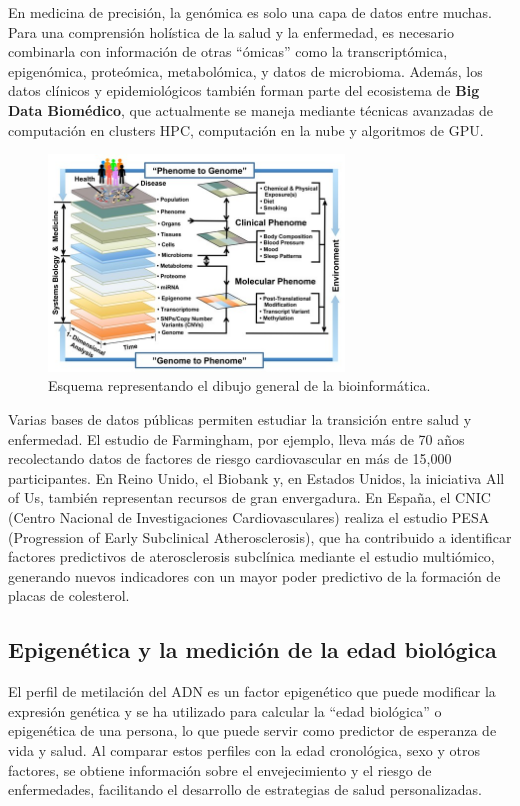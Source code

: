 En medicina de precisión, la genómica es solo una capa de datos entre muchas. Para una comprensión holística de la salud y la enfermedad, es necesario combinarla con información de otras “ómicas” como la transcriptómica, epigenómica, proteómica, metabolómica, y datos de microbioma. Además, los datos clínicos y epidemiológicos también forman parte del ecosistema de \textbf{Big Data Biomédico}, que actualmente se maneja mediante técnicas avanzadas de computación en clusters HPC, computación en la nube y algoritmos de GPU.

\begin{figure}[htbp]
\centering
\includegraphics[width = 0.7\textwidth]{figs/bigger-picture-bioinfo.jpg}
\caption{Esquema representando el dibujo general de la bioinformática.}
\end{figure}

Varias bases de datos públicas permiten estudiar la transición entre salud y enfermedad. El estudio de Farmingham, por ejemplo, lleva más de 70 años recolectando datos de factores de riesgo cardiovascular en más de 15,000 participantes. En Reino Unido, el Biobank y, en Estados Unidos, la iniciativa All of Us, también representan recursos de gran envergadura. En España, el CNIC (Centro Nacional de Investigaciones Cardiovasculares) realiza el estudio PESA (Progression of Early Subclinical Atherosclerosis), que ha contribuido a identificar factores predictivos de aterosclerosis subclínica mediante el estudio multiómico, generando nuevos indicadores con un mayor poder predictivo de la formación de placas de colesterol.

\subsection{Epigenética y la medición de la edad biológica}
El perfil de metilación del ADN es un factor epigenético que puede modificar la expresión genética y se ha utilizado para calcular la “edad biológica” o epigenética de una persona, lo que puede servir como predictor de esperanza de vida y salud. Al comparar estos perfiles con la edad cronológica, sexo y otros factores, se obtiene información sobre el envejecimiento y el riesgo de enfermedades, facilitando el desarrollo de estrategias de salud personalizadas.

